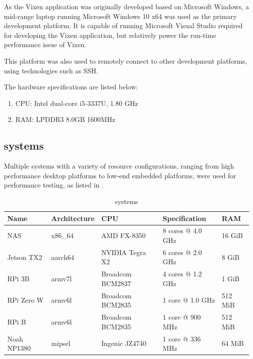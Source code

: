 As the Vixen application was originally developed based on Microsoft Windows,  a mid-range laptop running Microsoft Windows 10 x64 was used as the primary development platform. It is capable of running Microsoft Visual Studio  required for developing the Vixen application, but  relatively  power the run-time performance issue of Vixen.

This platform was also used to remotely connect to other development platforms, using technologies such as SSH.

The hardware specifications are listed below:

\begin{enumerate}[noitemsep,label={}]
  \item CPU: Intel dual-core i5-3337U, 1.80 GHz
  \item RAM: LPDDR3 8.0GB 1600MHz
\end{enumerate}

\subsection{ systems}
\label{sec:systems}

Multiple  systems with a variety of resource configurations, ranging from high performance desktop platforms to low-end embedded platforms, were used for performance testing, as listed in .

\begin{table}[t]
  \centering
  \begin{tabular}{l|l|l|l|l}
    \hline
    \textbf{Name} & \textbf{Architecture} & \textbf{CPU} & \textbf{Specification} & \textbf{RAM} \\ \hline
    \hline
    NAS         & x86\_64 & AMD FX-8350       & 8 cores @ 4.0 GHz  & 16 GiB   \\ \hline
    Jetson TX2  & aarch64 & NVIDIA Tegra X2   & 6 cores @ 2.0 GHz  & 8 GiB    \\ \hline
    RPi 3B      & armv7l  & Broadcom BCM2837  & 4 cores @ 1.2 GHz  & 1 GiB    \\ \hline
    RPi Zero W  & armv6l  & Broadcom BCM2835  & 1 core @ 1.0 GHz   & 512 MiB  \\ \hline
    RPi B       & armv6l  & Broadcom BCM2835  & 1 core @ 900 MHz   & 512 MiB  \\ \hline
    Noah NP1380 & mipsel  & Ingenic JZ4740    & 1 core @ 336 MHz   & 64 MiB   \\ \hline
  \end{tabular}
  \caption{\footnotesize {} systems}
  \label{tbl:linux}
\end{table}

